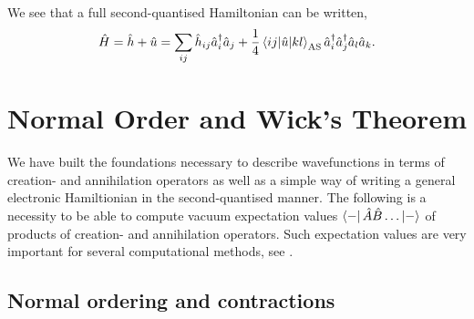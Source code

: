     We see that a full second-quantised Hamiltonian can be written,
    \begin{equation}
        \label{eq:second_quant_hamiltionian}
        \hat{H} = \hat{h} + \hat{u} 
        = \sum_{ij} \hat{h}_{ij}\hat{a}^\dagger_i \hat{a}_j
            + \frac{1}{4} \mel{ij}{\hat{u}}{kl}_\text{AS}
            \hat{a}^\dagger_i \hat{a}^\dagger_j \hat{a}_l \hat{a}_k.
    \end{equation}

\section{Normal Order and Wick's Theorem}

    We have built the foundations necessary to describe wavefunctions in terms
    of creation- and annihilation operators as well as a simple way of writing
    a general electronic Hamiltionian in the second-quantised manner. The following
    is a necessity to be able to compute vacuum expectation values 
    $\bra{-} \hat{A} \hat{B} \dots \ket{-}$ of products of creation- 
    and annihilation operators. Such expectation values are very important for 
    several computational methods, see
    \citeauthor{harris1992algebraic} \cite{harris1992algebraic}.

        \subsection{Normal ordering and contractions}

